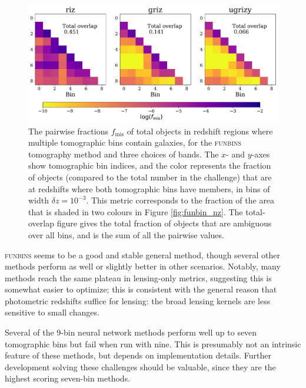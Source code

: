 \documentclass[twocolumn,twocolappendix]{aastex63}
\begin{document}
\begin{figure}[htbp]
\includegraphics[width=0.9\linewidth]{results/nzoverlap_dc2_funbins.pdf}
\caption{The pairwise fractions $f_\mathrm{mis}$ of total objects in redshift regions where multiple tomographic bins contain galaxies, for 
the \textsc{funbins} tomography method and three choices of bands.  
The $x$- and $y$-axes 
show tomographic bin indices, 
and the color represents the fraction of objects (compared to the total number in the challenge) that are 
at redshifts where both tomographic bins have members, in bins of width $\delta z=10^{-3}$.  
This metric corresponds to
the fraction of the area that is shaded in two colours in Figure \ref{fig:funbin_nz}.
The total-overlap figure gives the total fraction of objects
that are ambiguous over all bins, and is the sum of all the pairwise values.}
\label{fig:overlap}
\end{figure}



\textsc{funbins} seems to be a good and stable general method, though several other methods perform as well
or slightly better in other scenarios.  Notably, many methods reach the same plateau in lensing-only metrics,
suggesting this is somewhat easier to optimize; this is consistent with the general reason that photometric
redshifts suffice for lensing: the broad lensing kernels are less sensitive to small changes.

Several of the 9-bin neural network methods perform well up to seven tomographic bins but fail when run with 
nine.  This is presumably not an intrinsic feature of these methods, but depends on implementation details.
Further development solving these challenges should be valuable, since they are the highest scoring seven-bin
methods.
\end{document}
